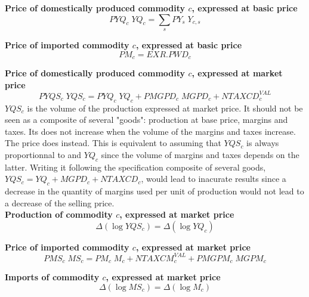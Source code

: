 \documentclass[12pt]{article}
\numberwithin{equation}{section}
\begin{document}
\noindent \textbf{Price of domestically produced commodity $c$, expressed at basic price} 
\begin{dmath}
PYQ_{c} \; YQ_{c} = \sum_{s} PY_{s} \; Y_{c, s}
\label{prices.mdlPYQ[c]}
\end{dmath}

\noindent \textbf{Price of imported commodity $c$, expressed at basic price} 
\begin{dmath}
PM_{c} = EXR . PWD_{c}
\label{prices.mdlPM[c]}
\end{dmath}

\noindent \textbf{Price of domestically produced commodity $c$, expressed at market price} 
\begin{dmath}
PYQS_{c} \; YQS_{c} = PYQ_{c} \; YQ_{c} + PMGPD_{c} \; MGPD_{c} + NTAXCD^{VAL}_{c}
\label{prices.mdlPYQS[c]}
\end{dmath}
$YQS_{c}$ is the volume of the production expressed at market price. It should not be seen as a composite of several "goods": production at base price, margins and taxes. Its does not increase when the volume of the margins and taxes increase. The price does instead. This is equivalent to assuming that $YQS_{c}$ is always proportionnal to and $YQ_{c}$ since the volume of margins and taxes depends on the latter. Writing it following the specification composite of several goods, $YQS_{c} = YQ_{c} + MGPD_{c} + NTAXCD_{c}$, would lead to inacurate results since a decrease in the quantity of margins used per unit of production would not lead to a decrease of the selling price. \\

\noindent \textbf{Production of commodity $c$, expressed at market price} 
\begin{dmath}
\varDelta \left(\operatorname{log} YQS_{c}\right) = \varDelta \left(\operatorname{log} YQ_{c}\right)
\label{prices.mdlYQS[c]}
\end{dmath}

\noindent \textbf{Price of imported commodity $c$, expressed at market price} 
\begin{dmath}
PMS_{c} \; MS_{c} = PM_{c} \; M_{c} + NTAXCM^{VAL}_{c} + PMGPM_{c} \; MGPM_{c}
\label{prices.mdlPMS[c]}
\end{dmath}

\noindent \textbf{Imports of commodity $c$, expressed at market price} 
\begin{dmath}
\varDelta \left(\operatorname{log} MS_{c}\right) = \varDelta \left(\operatorname{log} M_{c}\right)
\label{prices.mdlMS[c]}
\end{dmath}
\end{document}
